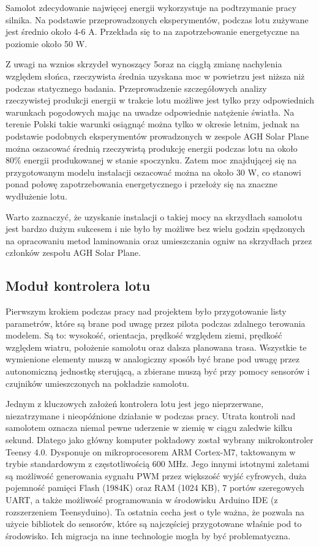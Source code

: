 \documentclass[12pt, a4paper]{article}
\begin{document}
Samolot zdecydowanie najwięcej energii wykorzystuje na podtrzymanie pracy silnika. Na podstawie przeprowadzonych eksperymentów, podczas lotu zużywane jest średnio około 4-6 A. Przekłada się to na zapotrzebowanie energetyczne na poziomie około 50 W. 

Z uwagi na wznios skrzydeł wynoszący 5\textdegree oraz na ciągłą zmianę nachylenia względem słońca, rzeczywista średnia uzyskana moc w powietrzu jest niższa niż podczas statycznego badania. Przeprowadzenie szczegółowych analizy rzeczywistej produkcji energii w trakcie lotu możliwe jest tylko przy odpowiednich warunkach pogodowych mając na uwadze odpowiednie natężenie światła. Na terenie Polski takie warunki osiągnąć można tylko w okresie letnim, jednak na podstawie podobnych eksperymentów prowadzonych w zespole AGH Solar Plane można oszacować średnią rzeczywistą produkcję energii podczas lotu na około 80\% energii produkowanej w stanie spoczynku. Zatem moc znajdującej się na przygotowanym modelu instalacji oszacować można na około 30 W, co stanowi ponad połowę zapotrzebowania energetycznego i przełoży się na znaczne wydłużenie lotu.

Warto zaznaczyć, że uzyskanie instalacji o takiej mocy na skrzydłach samolotu jest bardzo dużym sukcesem i nie było by możliwe bez wielu godzin spędzonych na opracowaniu metod laminowania oraz umieszczania ogniw na skrzydłach przez członków zespołu AGH Solar Plane.

\FloatBarrier
\subsection{Moduł kontrolera lotu}
Pierwszym krokiem podczas pracy nad projektem  było przygotowanie listy parametrów, które są brane pod uwagę przez pilota podczas zdalnego terowania modelem. Są to: wysokość, orientacja, prędkość względem ziemi, prędkość względem wiatru, położenie samolotu oraz dalsza planowana trasa. Wszystkie te wymienione elementy muszą w analogiczny sposób być brane pod uwagę przez autonomiczną jednostkę sterującą, a zbierane muszą być przy pomocy sensorów i czujników umieszczonych na pokładzie samolotu. 

Jednym z kluczowych założeń kontrolera lotu jest jego nieprzerwane, niezatrzymane i nieopóźnione działanie w podczas pracy. Utrata kontroli nad samolotem oznacza niemal pewne uderzenie w ziemię w ciągu zaledwie kilku sekund. Dlatego jako główny komputer pokładowy został wybrany mikrokontroler Teensy 4.0. Dysponuje on mikroprocesorem ARM Cortex-M7, taktowanym w trybie standardowym z częstotliwością 600 MHz. Jego innymi istotnymi zaletami są możliwość generowania sygnału PWM przez większość wyjść cyfrowych, duża pojemność pamięci Flash (1984K) oraz RAM (1024 KB), 7 portów szeregowych UART, a także możliwość programowania w środowisku Arduino IDE (z rozszerzeniem Teensyduino). Ta ostatnia cecha jest o tyle ważna, że pozwala na użycie bibliotek do sensorów, które są najczęściej przygotowane właśnie pod to środowisko. Ich migracja na inne technologie mogła by być problematyczna. 
\end{document}
